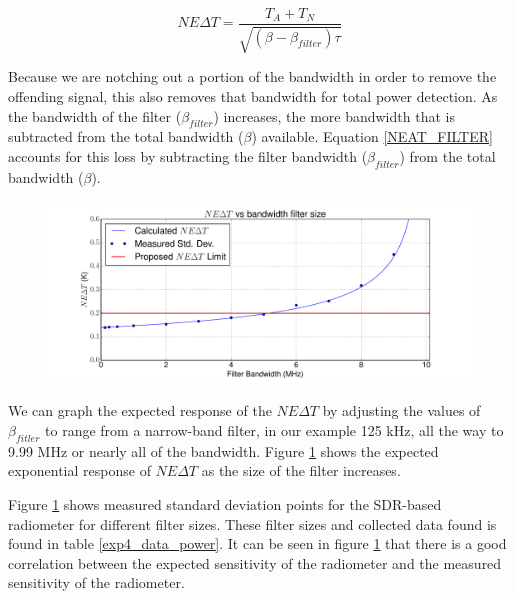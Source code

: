 {\begin{equation}\label{NEAT_FILTER}
NE\Delta T=\frac{T_{A}+T_{N}}{\sqrt{(\beta - \beta_{filter})  \tau}}
\end{equation}

Because we are notching out a portion of the bandwidth in order to remove the offending signal, this also removes that bandwidth for total power detection.  As the bandwidth of the filter ($\beta_{filter}$) increases, the more bandwidth that is subtracted from the total bandwidth ($\beta$) available.  Equation \ref{NEAT_FILTER} accounts for this loss by subtracting the filter bandwidth ($\beta_{filter}$) from the total bandwidth ($\beta$).  

\begin{figure}[h!tb] \centering
\includegraphics[width=\textwidth]{Experiments/Exp5/neatvsbw_plot.pdf}
\label{neat_bw}
\end{figure}

We can graph the expected response of the $NE\Delta T$ by adjusting the values of $\beta_{fitler}$ to range from a narrow-band filter, in our example 125 kHz, all the way to 9.99 MHz or nearly all of the bandwidth.  Figure \ref{neat_bw} shows the expected exponential response of $NE\Delta T$ as the size of the filter increases.  

Figure \ref{neat_bw} shows measured standard deviation points for the SDR-based radiometer for different filter sizes.  These filter sizes and collected data found is found in table \ref{exp4_data_power}.  It can be seen in figure \ref{neat_bw} that there is a good correlation between the expected sensitivity of the radiometer and the measured sensitivity of the radiometer.

}
